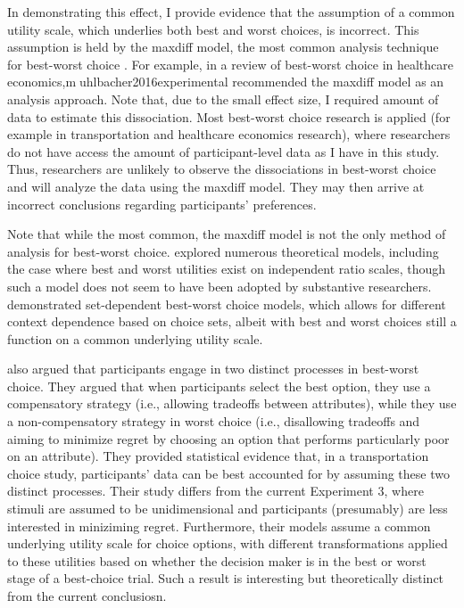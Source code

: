 In demonstrating this effect, I provide evidence that the assumption of a common utility scale, which underlies both best and worst choices, is incorrect. This assumption is held by the maxdiff model, the most common analysis technique for best-worst choice \parencite{marleyProbabilisticModelsBest2005,hawkinsBestTimesWorst2014}. For example, in a review of best-worst choice in healthcare economics,\textcircled{muhlbacher2016experimental} recommended the maxdiff model as an analysis approach. Note that, due to the small effect size, I required amount of data to estimate this dissociation. Most best-worst choice research is applied (for example in transportation and healthcare economics research), where researchers do not have access the amount of participant-level data as I have in this study. Thus, researchers are unlikely to observe the dissociations in best-worst choice and will analyze the data using the maxdiff model. They may then arrive at incorrect conclusions regarding participants' preferences. 

Note that while the most common, the maxdiff model is not the only method of analysis for best-worst choice. \textcite{marleyProbabilisticModelsBest2005} explored numerous theoretical models, including the case where best and worst utilities exist on independent ratio scales, though such a model does not seem to have been adopted by substantive researchers. \textcite{marleyProbabilisticModelsSetdependent2008} demonstrated set-dependent best-worst choice models, which allows for different context dependence based on choice sets, albeit with best and worst choices still a function on a common underlying utility scale. 

\textcite{gervzinivc2021estimating} also argued that participants engage in two distinct processes in best-worst choice. They argued that when participants select the best option, they use a compensatory strategy (i.e., allowing tradeoffs between attributes), while they use a non-compensatory strategy in worst choice (i.e., disallowing tradeoffs and aiming to minimize regret by choosing an option that performs particularly poor on an attribute). They provided statistical evidence that, in a transportation choice study, participants' data can be best accounted for by assuming these two distinct processes. Their study differs from the current Experiment 3, where stimuli are assumed to be unidimensional and participants (presumably) are less interested in miniziming regret. Furthermore, their models assume a common underlying utility scale for choice options, with different transformations applied to these utilities based on whether the decision maker is in the best or worst stage of a best-choice trial. Such a result is interesting but theoretically distinct from the current conclusiosn.
